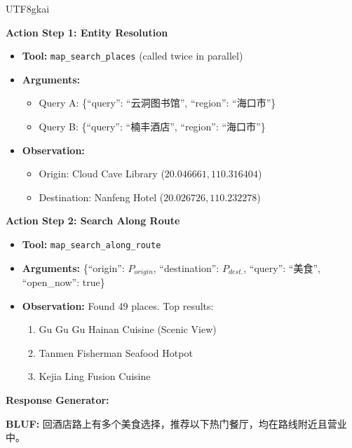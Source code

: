 \documentclass{article} %
\begin{document}
\begin{CJK*}{UTF8}{gkai}
\begin{tcolorbox}[
    breakable,
    enhanced,
    colframe=color_amapblue,
    colback=mycolor,
    coltitle=white,
    title = {\textbf{Case Study: Route-based Dining Recommendation}},
    fonttitle=\bfseries
]
\textbf{Action Step 1: Entity Resolution}
\begin{itemize}[leftmargin=12pt, itemsep=0pt]
  \item \textbf{Tool:} \texttt{map\_search\_places} (called twice in parallel)
  \item \textbf{Arguments:} 
    \begin{itemize}[leftmargin=10pt]
        \item Query A: \{``query'': ``云洞图书馆'', ``region'': ``海口市''\}
        \item Query B: \{``query'': ``楠丰酒店'', ``region'': ``海口市''\}
    \end{itemize}
  \item \textbf{Observation:} 
    \begin{itemize}[leftmargin=10pt]
        \item Origin: Cloud Cave Library ($20.046661, 110.316404$)
        \item Destination: Nanfeng Hotel ($20.026726, 110.232278$)
    \end{itemize}
\end{itemize}
\vspace{5pt}
\textbf{Action Step 2: Search Along Route}
\begin{itemize}[leftmargin=12pt, itemsep=0pt]
  \item \textbf{Tool:} \texttt{map\_search\_along\_route}
  \item \textbf{Arguments:} 
    \{``origin'': $P_{origin}$, ``destination'': $P_{dest.}$, ``query'': ``美食'', ``open\_now'': true\}
  \item \textbf{Observation:} Found 49 places. Top results:
    \begin{enumerate}[leftmargin=15pt, label=\arabic*.]
        \item Gu Gu Gu Hainan Cuisine (Scenic View)
        \item Tanmen Fisherman Seafood Hotpot
        \item Kejia Ling Fusion Cuisine
    \end{enumerate}
\end{itemize}

\vspace{5pt}

\textbf{Response Generator:}
\begin{tcolorbox}[colback=white, colframe=color_amapblue!30!white, arc=4pt, boxrule=1pt, left=4pt, right=4pt, top=4pt, bottom=4pt]
    \small
    \textbf{BLUF:} 回酒店路上有多个美食选择，推荐以下热门餐厅，均在路线附近且营业中。
    

\end{tcolorbox}
\end{tcolorbox}
\end{CJK*}
\end{document}
